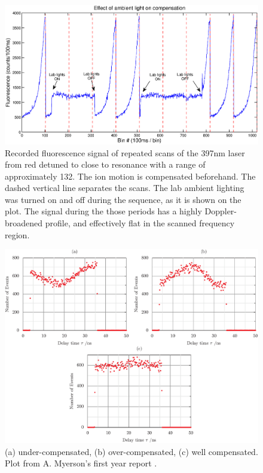 \begin{figure}[h!t]
\centering
\includegraphics[width=14.5cm]{chapter6/lablights/lablights3}
\caption[Effect of ambient light on ion compensation]{Recorded fluorescence signal of repeated scans of the 397nm laser from red detuned to close to resonance with a range of approximately 132\MHz. The ion motion is compensated beforehand. The dashed vertical line separates the scans. The lab ambient lighting was turned on and off during the sequence, as it is shown on the plot. The signal during the those periods has a highly Doppler-broadened profile, and effectively flat in the scanned frequency region. }
\label{lablightingcompensate}
\end{figure} 

\begin{figure}[h!t]
\centering
\includegraphics[width=14.5cm]{chapter6/rfcorr/rfexplots}
\caption[]{(a) under-compensated, (b) over-compensated, (c) well compensated. Plot from A. Myerson's first year report \cite{Myerson2007}.}
\label{rfcorrelation}
\end{figure} 



